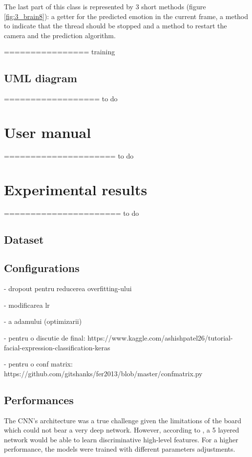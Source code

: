 \documentclass[runningheads,a4paper,12pt]{report}
\begin{document}
The last part of this class is represented by 3 short methods (figure \ref{fig:3_brain8}): a getter for the predicted emotion in the current frame, a method to indicate that the thread should be stopped and a method to restart the camera and the prediction algorithm.

================ training

\subsection*{UML diagram}

================== to do

\section{User manual}
\label{chapter:manual}
===================== to do

\section{Experimental results}
\label{chapter:results}

====================== to do

\subsection{Dataset}
\label{subsection:dataset}


\subsection{Configurations}
\label{chapter:configurations}
- dropout pentru reducerea overfitting-ului

- modificarea lr

- a adamului (optimizarii)

- pentru o discutie de final: https://www.kaggle.com/ashishpatel26/tutorial-facial-expression-classification-keras

- pentru o conf matrix: https://github.com/gitshanks/fer2013/blob/master/confmatrix.py

\subsection{Performances}
\label{chapter:performances}
The CNN's architecture was a true challenge given the limitations of the board which could not bear a very deep network. However, according to \cite{fer-cnn}, a 5 layered network would be able to learn discriminative high-level features. For a higher performance, the models were trained with different parameters adjustments. 
\end{document}

